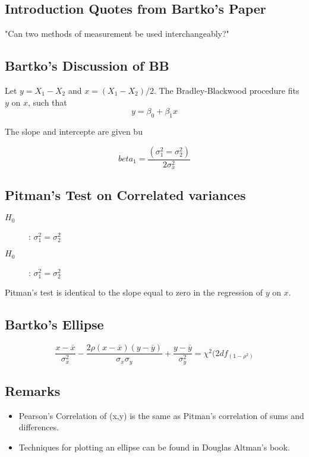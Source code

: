\documentclass[MASTER.tex]{subfiles}
\begin{document}
\subsection*{Introduction Quotes from Bartko's Paper}
"Can two methods of measurement be used interchangeably?"


\subsection*{Bartko's Discussion of BB}

Let $y = X_1 - X_2$ and $x= (X_1 - X_2)/2$.
The Bradley-Blackwood procedure fits $y$ on $x$, such that
\[ y = \beta_0 + \beta_1x \]

The slope and intercepte are given bu

\[beta_1 =  \frac{(\sigma^2_1 = \sigma^2_2)}{2\sigma^2_x}\]
\subsection*{Pitman's Test on Correlated variances}
\begin{description}
\item[$H_0$] : $\sigma^2_1 = \sigma^2_2$
\item[$H_0$] : $\sigma^2_1 = \sigma^2_2$
\end{description}


Pitman's test is identical to the slope equal to zero in the regression of $y$ on $x$.


\subsection*{Bartko's Ellipse}

\[ \frac{x - \bar{x}}{\sigma^2_x} - \frac{2\rho(x - \bar{x})(y - \bar{y})}{\sigma_x \sigma_y} + \frac{y - \bar{y}}{\sigma^2_y} = \chi^2(2df_(1-\rho^2) \]

\subsection*{Remarks}
\begin{itemize}
\item Pearson's Correlation of (x,y) is the same as Pitman's correlation of sums and differences.

\item Techniques for plotting an ellipse can be found in Douglas Altman's book.
\end{itemize}
\newpage
\end{document}
